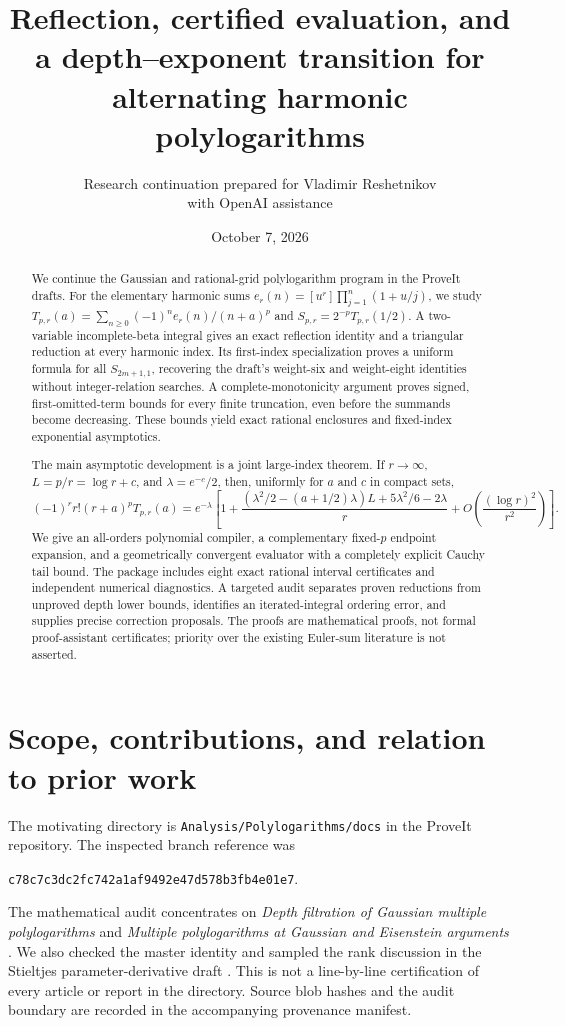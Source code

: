 \documentclass[11pt]{article}
\title{Reflection, certified evaluation, and a depth--exponent transition for alternating harmonic polylogarithms}
\author{Research continuation prepared for Vladimir Reshetnikov\\\small with OpenAI assistance}
\date{October 7, 2026}
\numberwithin{equation}{section}
\theoremstyle{definition}\newtheorem{definition}[theorem]{Definition}
\theoremstyle{remark}\newtheorem{remark}[theorem]{Remark}
\newcommand{\src}[1]{\nolinkurl{#1}}
\begin{document}
\maketitle
\begin{abstract}
We continue the Gaussian and rational-grid polylogarithm program in the ProveIt drafts. For the elementary harmonic sums
$e_r(n)=[u^r]\prod_{j=1}^n(1+u/j)$, we study
$T_{p,r}(a)=\sum_{n\ge0}(-1)^n e_r(n)/(n+a)^p$ and
$S_{p,r}=2^{-p}T_{p,r}(1/2)$. A two-variable incomplete-beta integral gives an exact reflection identity and a triangular reduction at every harmonic index. Its first-index specialization proves a uniform formula for all $S_{2m+1,1}$, recovering the draft's weight-six and weight-eight identities without integer-relation searches. A complete-monotonicity argument proves signed, first-omitted-term bounds for every finite truncation, even before the summands become decreasing. These bounds yield exact rational enclosures and fixed-index exponential asymptotics.

The main asymptotic development is a joint large-index theorem. If $r\to\infty$, $L=p/r=\log r+c$, and $\lambda=e^{-c}/2$, then, uniformly for $a$ and $c$ in compact sets,
\[
(-1)^r r!(r+a)^pT_{p,r}(a)=e^{-\lambda}
\left[1+\frac{(\lambda^2/2-(a+1/2)\lambda)L+5\lambda^2/6-2\lambda}{r}
+O\!\left(\frac{(\log r)^2}{r^2}\right)\right].
\]
We give an all-orders polynomial compiler, a complementary fixed-$p$ endpoint expansion, and a geometrically convergent evaluator with a completely explicit Cauchy tail bound. The package includes eight exact rational interval certificates and independent numerical diagnostics. A targeted audit separates proven reductions from unproved depth lower bounds, identifies an iterated-integral ordering error, and supplies precise correction proposals. The proofs are mathematical proofs, not formal proof-assistant certificates; priority over the existing Euler-sum literature is not asserted.
\end{abstract}
\newpage
\tableofcontents
\newpage

\section{Scope, contributions, and relation to prior work}
\label{sec:scope}

The motivating directory is \src{Analysis/Polylogarithms/docs} in the ProveIt repository. The inspected branch reference was
\begin{center}\small\src{c78c7c3dc2fc742a1af9492e47d578b3fb4e01e7}.\end{center}
The mathematical audit concentrates on \emph{Depth filtration of Gaussian multiple polylogarithms} \cite{repoGaussian} and \emph{Multiple polylogarithms at Gaussian and Eisenstein arguments} \cite{repoDouble}. We also checked the master identity and sampled the rank discussion in the Stieltjes parameter-derivative draft \cite{repoStieltjes}. This is not a line-by-line certification of every article or report in the directory. Source blob hashes and the audit boundary are recorded in the accompanying provenance manifest.
\end{document}
